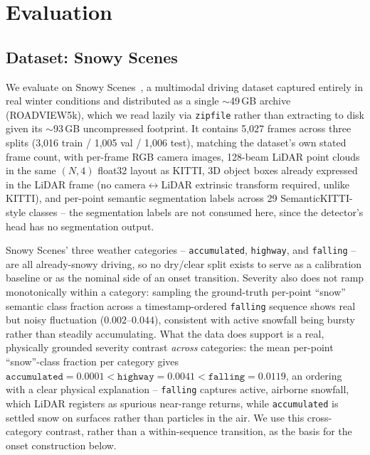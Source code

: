 \section{Evaluation}
\label{sec:experiments}

\subsection{Dataset: Snowy Scenes}
\label{sec:dataset}

We evaluate on Snowy Scenes~\cite{SnowyScenes2026}, a multimodal driving dataset captured entirely in real winter conditions and distributed as a single $\sim$49\,GB archive (ROADVIEW5k), which we read lazily via \texttt{zipfile} rather than extracting to disk given its $\sim$93\,GB uncompressed footprint. It contains 5{,}027 frames across three splits (3{,}016 train / 1{,}005 val / 1{,}006 test), matching the dataset's own stated frame count, with per-frame RGB camera images, 128-beam LiDAR point clouds in the same $(N,4)$ float32 layout as KITTI, 3D object boxes already expressed in the LiDAR frame (no camera$\leftrightarrow$LiDAR extrinsic transform required, unlike KITTI), and per-point semantic segmentation labels across 29 SemanticKITTI-style classes -- the segmentation labels are not consumed here, since the detector's head has no segmentation output.

Snowy Scenes' three weather categories -- \texttt{accumulated}, \texttt{highway}, and \texttt{falling} -- are all already-snowy driving, so no dry/clear split exists to serve as a calibration baseline or as the nominal side of an onset transition. Severity also does not ramp monotonically within a category: sampling the ground-truth per-point ``snow'' semantic class fraction across a timestamp-ordered \texttt{falling} sequence shows real but noisy fluctuation ($0.002$--$0.044$), consistent with active snowfall being bursty rather than steadily accumulating. What the data does support is a real, physically grounded severity contrast \emph{across} categories: the mean per-point ``snow''-class fraction per category gives $\texttt{accumulated} = 0.0001 < \texttt{highway} = 0.0041 < \texttt{falling} = 0.0119$, an ordering with a clear physical explanation -- \texttt{falling} captures active, airborne snowfall, which LiDAR registers as spurious near-range returns, while \texttt{accumulated} is settled snow on surfaces rather than particles in the air. We use this cross-category contrast, rather than a within-sequence transition, as the basis for the onset construction below.

